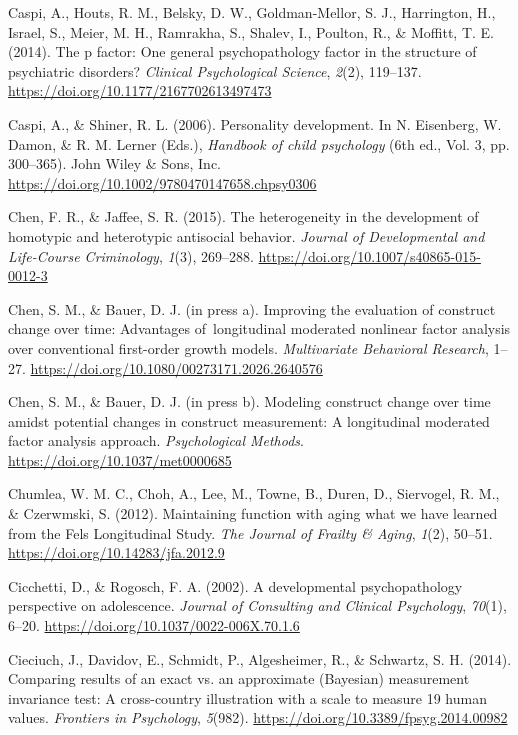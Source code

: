 \documentclass[
  american,
  letterpaper,
  12pt]{article}
\newlength{\cslhangindent}
\newenvironment{CSLReferences}[2] %
 {\begin{list}{}{%
  \setlength{\itemindent}{0pt}
  \setlength{\leftmargin}{0pt}
  \setlength{\parsep}{0pt}
  \ifodd #1
   \setlength{\leftmargin}{\cslhangindent}
   \setlength{\itemindent}{-1\cslhangindent}
  \fi
  \setlength{\itemsep}{#2\baselineskip}}}
 {\end{list}}
\begin{document}
\begin{CSLReferences}{1}{0}
Caspi, A., Houts, R. M., Belsky, D. W., Goldman-Mellor, S. J.,
Harrington, H., Israel, S., Meier, M. H., Ramrakha, S., Shalev, I.,
Poulton, R., \& Moffitt, T. E. (2014). The {p} factor: {One} general
psychopathology factor in the structure of psychiatric disorders?
\emph{Clinical Psychological Science}, \emph{2}(2), 119--137.
\url{https://doi.org/10.1177/2167702613497473}

Caspi, A., \& Shiner, R. L. (2006). Personality development. In N.
Eisenberg, W. Damon, \& R. M. Lerner (Eds.), \emph{Handbook of child
psychology} (6th ed., Vol. 3, pp. 300--365). John Wiley \& Sons, Inc.
\url{https://doi.org/10.1002/9780470147658.chpsy0306}

Chen, F. R., \& Jaffee, S. R. (2015). The heterogeneity in the
development of homotypic and heterotypic antisocial behavior.
\emph{Journal of Developmental and Life-Course Criminology},
\emph{1}(3), 269--288. \url{https://doi.org/10.1007/s40865-015-0012-3}

Chen, S. M., \& Bauer, D. J. (in press a). Improving the evaluation of
construct change over time: {Advantages} of~longitudinal moderated
nonlinear factor analysis over conventional first-order growth models.
\emph{Multivariate Behavioral Research}, 1--27.
\url{https://doi.org/10.1080/00273171.2026.2640576}

Chen, S. M., \& Bauer, D. J. (in press b). Modeling construct change
over time amidst potential changes in construct measurement: {A}
longitudinal moderated factor analysis approach. \emph{Psychological
Methods}. \url{https://doi.org/10.1037/met0000685}

Chumlea, W. M. C., Choh, A., Lee, M., Towne, B., Duren, D., Siervogel,
R. M., \& Czerwmski, S. (2012). Maintaining function with aging what we
have learned from the {Fels Longitudinal Study}. \emph{The Journal of
Frailty \& Aging}, \emph{1}(2), 50--51.
\url{https://doi.org/10.14283/jfa.2012.9}

Cicchetti, D., \& Rogosch, F. A. (2002). A developmental psychopathology
perspective on adolescence. \emph{Journal of Consulting and Clinical
Psychology}, \emph{70}(1), 6--20.
\url{https://doi.org/10.1037/0022-006X.70.1.6}

Cieciuch, J., Davidov, E., Schmidt, P., Algesheimer, R., \& Schwartz, S.
H. (2014). Comparing results of an exact vs. {an} approximate
({Bayesian}) measurement invariance test: {A} cross-country illustration
with a scale to measure 19 human values. \emph{Frontiers in Psychology},
\emph{5}(982). \url{https://doi.org/10.3389/fpsyg.2014.00982}


\end{CSLReferences}
\end{document}
